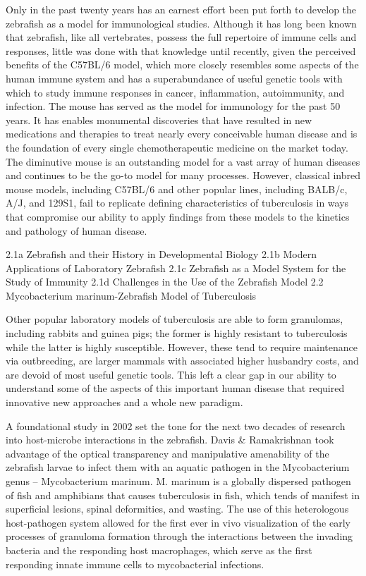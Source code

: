 Only in the past twenty years has an earnest effort been put forth to develop the zebrafish as a model for immunological studies. Although it has long been known that zebrafish, like all vertebrates, possess the full repertoire of immune cells and responses, little was done with that knowledge until recently, given the perceived benefits of the C57BL/6 model, which more closely resembles some aspects of the human immune system and has a superabundance of useful genetic tools with which to study immune responses in cancer, inflammation, autoimmunity, and infection. 
The mouse has served as the model for immunology for the past 50 years. It has enables monumental discoveries that have resulted in new medications and therapies to treat nearly every conceivable human disease and is the foundation of every single chemotherapeutic medicine on the market today. The diminutive mouse is an outstanding model for a vast array of human diseases and continues to be the go-to model for many processes. However, classical inbred mouse models, including C57BL/6 and other popular lines, including BALB/c, A/J, and 129S1, fail to replicate defining characteristics of tuberculosis in ways that compromise our ability to apply findings from these models to the kinetics and pathology of human disease. 

2.1a Zebrafish and their History in Developmental Biology
2.1b Modern Applications of Laboratory Zebrafish
2.1c Zebrafish as a Model System for the Study of Immunity
2.1d Challenges in the Use of the Zebrafish Model
2.2 Mycobacterium marinum-Zebrafish Model of Tuberculosis

Other popular laboratory models of tuberculosis are able to form granulomas, including rabbits and guinea pigs; the former is highly resistant to tuberculosis while the latter is highly susceptible. However, these tend to require maintenance via outbreeding, are larger mammals with associated higher husbandry costs, and are devoid of most useful genetic tools. This left a clear gap in our ability to understand some of the aspects of this important human disease that required innovative new approaches and a whole new paradigm. 

A foundational study in 2002 set the tone for the next two decades of research into host-microbe interactions in the zebrafish. Davis & Ramakrishnan took advantage of the optical transparency and manipulative amenability of the zebrafish larvae to infect them with an aquatic pathogen in the Mycobacterium genus – Mycobacterium marinum. M. marinum is a globally dispersed pathogen of fish and amphibians that causes tuberculosis in fish, which tends of manifest in superficial lesions, spinal deformities, and wasting. The use of this heterologous host-pathogen system allowed for the first ever in vivo visualization of the early processes of granuloma formation through the interactions between the invading bacteria and the responding host macrophages, which serve as the first responding innate immune cells to mycobacterial infections. 

